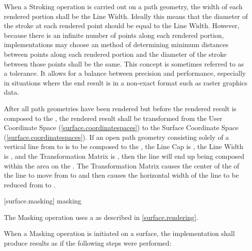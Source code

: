 \pnum
When a Stroking operation is carried out on a path geometry, the width of each rendered portion shall be the Line Width. Ideally this means that the diameter of the stroke at each rendered point should be equal to the Line Width. However, because there is an infinite number of points along each rendered portion, implementations may choose an \unspecnorm method of determining minimum distances between points along each rendered portion and the diameter of the stroke between those points shall be the same.
\enternote
This concept is sometimes referred to as a tolerance. It allows for a balance between precision and performance, especially in situations where the end result is in a non-exact format such as raster graphics data.
\exitnote

\pnum
After all path geometries have been rendered but before the rendered result is composed to the \underlyingsurface, the rendered result shall be transformed from the User Coordinate Space (\ref{surface.coordinatespaces}) to the Surface Coordinate Space (\ref{surface.coordinatespaces}).
\enterexample
If an open path geometry consisting solely of a vertical line from  to  is to be composed to the \underlyingsurface, the Line Cap is , the Line Width is , and the Transformation Matrix is , then the line will end up being composed within the area  on the \underlyingsurface. The Transformation Matrix causes the center of the \xaxis of the line to move from  to  and then causes the horizontal width of the line to be reduced from  to .
\exitexample

 [surface.masking] { masking}

\pnum
The Masking operation uses a  as described in \ref{surface.rendering}.

\pnum
When a Masking operation is initiated on a surface, the implementation shall produce results as if the following steps were performed:

